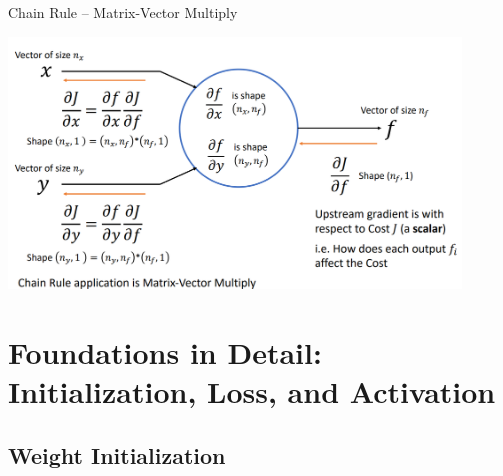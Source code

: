\documentclass[serif, aspectratio=169]{beamer}
\begin{document}
\begin{frame}{Chain Rule – Matrix-Vector Multiply}
    \begin{center}
        \includegraphics[width=12cm]{pic/chain6.png}  
    \end{center}
\end{frame}

\section{Foundations in Detail: Initialization, Loss, and Activation}
\subsection{Weight Initialization}
\end{document}
